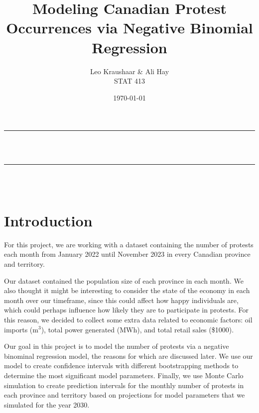 \documentclass[12pt]{article}
\title{Modeling Canadian Protest Occurrences via Negative Binomial Regression}
\author{Leo Kraushaar \& Ali Hay \\ STAT 413}
\date{\today}
\begin{document}
\onehalfspacing

\begin{titlepage}
  \newcommand{\HRule}{\rule{\linewidth}{0.5mm}}
  \center

  \HRule \\[1cm]
  { \huge \bfseries \thetitle}\\[0.4cm]
  \HRule \\[1cm]

  \Large \thedate\\[5cm]

  \begin{minipage}{1\textwidth}
    \vspace{8cm}
    \begin{flushleft} \large
      \theauthor
    \end{flushleft}

  \end{minipage}
\end{titlepage}

\newpage
\section{Introduction}
For this project, we are working with a dataset containing the number of protests each month from January 2022 until November 2023 in every Canadian province and territory.

Our dataset contained the population size of each province in each month. We also thought it might be interesting to consider the state of the economy in each month over our timeframe, since this could affect how happy individuals are, which could perhaps influence how likely they are to participate in protests. For this reason, we decided to collect some extra data related to economic factors: oil imports (m$^3$), total power generated (MWh), and total retail sales (\$1000).

Our goal in this project is to model the number of protests via a negative binominal regression model, the reasons for which are discussed later. We use our model to create confidence intervals with different bootstrapping methods to determine the most significant model parameters. Finally, we use Monte Carlo simulation to create prediction intervals for the monthly number of protests in each province and territory based on projections for model parameters that we simulated for the year 2030.
\end{document}
